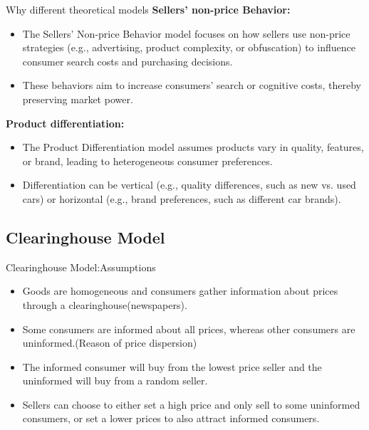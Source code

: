 \documentclass[aspectratio=169]{beamer}  %
\begin{document}
\begin{frame}{Why different theoretical models}
    \textbf{Sellers’ non-price Behavior:}
    \begin{itemize}
        \item The Sellers’ Non-price Behavior model focuses on how sellers use non-price strategies (e.g., advertising, product complexity, or obfuscation) to influence consumer search costs and purchasing decisions.
        \item These behaviors aim to increase consumers’ search or cognitive costs, thereby preserving market power.
    \end{itemize} 
    \textbf{Product differentiation:}
    \begin{itemize}
        \item The Product Differentiation model assumes products vary in quality, features, or brand, leading to heterogeneous consumer preferences.
        \item Differentiation can be vertical (e.g., quality differences, such as new vs. used cars) or horizontal (e.g., brand preferences, such as different car brands).
    \end{itemize}
\end{frame}
    

\subsection{Clearinghouse Model}
\begin{frame}{Clearinghouse Model:Assumptions}
    \begin{itemize}
        \item Goods are homogeneous and consumers gather information about prices through a clearinghouse(newspapers).
        \item Some consumers are informed about all prices, whereas other consumers are uninformed.(Reason of price dispersion)
        \item The informed consumer will buy from the lowest price seller and the uninformed will buy from a random seller.
        \item Sellers can choose to either set a high price and only sell to some uninformed consumers, or set a lower prices to also attract informed consumers.
    \end{itemize}
\end{frame}
\end{document}
